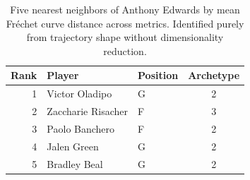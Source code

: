 \begin{table}[htbp]
  \centering\small
  \begin{tabular}{rllc}
    \toprule
    Rank & Player & Position & Archetype \\
    \midrule
    1 & Victor Oladipo & G & 2 \\
    2 & Zaccharie Risacher & F & 3 \\
    3 & Paolo Banchero & F & 2 \\
    4 & Jalen Green & G & 2 \\
    5 & Bradley Beal & G & 2 \\
    \bottomrule
  \end{tabular}
  \caption{Five nearest neighbors of Anthony Edwards by mean Fr\'{e}chet curve distance across metrics. Identified purely from trajectory shape without dimensionality reduction.}
  \label{tab:Anthony_Edwards_frechet_curve_neighbors}
\end{table}

